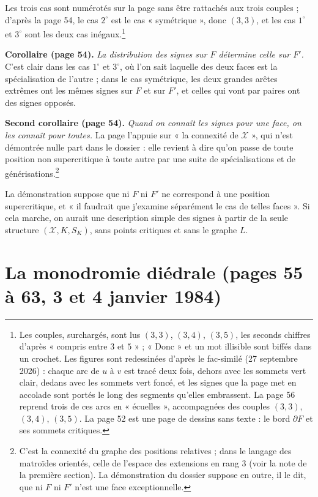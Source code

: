 \documentclass[11pt,a4paper]{article}
\begin{document}
Les trois cas sont numérotés sur la page sans être rattachés aux trois couples ;
d'après la page 54, le cas $2^{\circ}$ est le cas « symétrique », donc $(3, 3)$,
et les cas $1^{\circ}$ et $3^{\circ}$ sont les deux cas inégaux.\footnote{Les
couples, surchargés, sont lus $(3, 3)$, $(3, 4)$, $(3, 5)$, les seconds chiffres
d'après « compris entre $3$ et $5$ » ; « Donc » et un mot illisible sont biffés dans un crochet.
Les figures sont redessinées d'après le fac-similé (27 septembre 2026) : chaque
arc de $u$ à $v$ est tracé deux fois, dehors avec les sommets vert clair, dedans
avec les sommets vert foncé, et les signes que la page met en accolade sont
portés le long des segments qu'elles embrassent. La page 56 reprend trois de ces
arcs en « écuelles », accompagnées des couples $(3, 3)$, $(3, 4)$, $(3, 5)$. La page 52 est
une page de dessins sans texte : le bord $\partial F$ et ses sommets critiques.}

\textbf{Corollaire (page 54).} \emph{La distribution des signes sur $F$ détermine
celle sur $F'$.} C'est clair dans les cas $1^{\circ}$ et $3^{\circ}$, où l'on
sait laquelle des deux faces est la spécialisation de l'autre ; dans le cas
symétrique, les deux grandes arêtes extrêmes ont les mêmes signes sur $F$ et sur
$F'$, et celles qui vont par paires ont des signes opposés.

\textbf{Second corollaire (page 54).} \emph{Quand on connaît les signes pour une
face, on les connaît pour toutes.} La page l'appuie sur « la connexité de
$\mathcal{X}$ », qui n'est démontrée nulle part dans le dossier : elle revient à
dire qu'on passe de toute position non supercritique à toute autre par une suite
de spécialisations et de générisations.\footnote{C'est la connexité du graphe des
positions relatives ; dans le langage des matroïdes orientés, celle de l'espace
des extensions en rang $3$ (voir la note de la première section). La
démonstration du dossier suppose en outre, il le dit, que ni $F$ ni $F'$ n'est
une face exceptionnelle.}

La démonstration suppose que ni $F$ ni $F'$ ne correspond à une position
supercritique, et « il faudrait que j'examine séparément le cas de telles
faces ». Si cela marche, on aurait une description simple des signes à partir de
la seule structure $(\mathcal{X}, K, S_K)$, sans points critiques et sans le
graphe $L$.

\section*{La monodromie diédrale (pages 55 à 63, 3 et 4 janvier 1984)}
\end{document}
